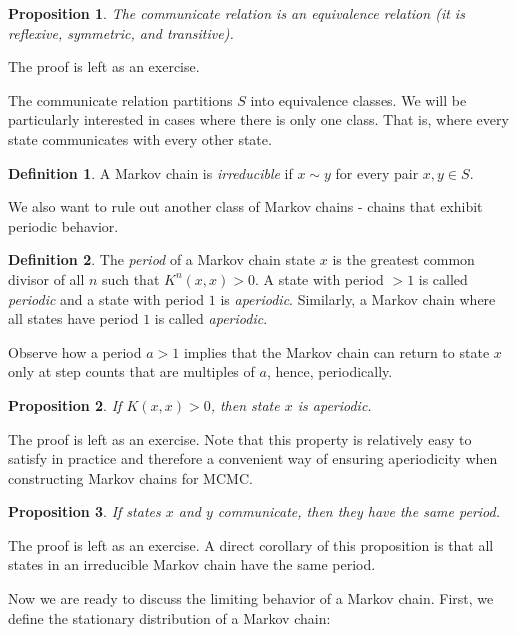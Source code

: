 \documentclass{book}
\theoremstyle{plain}%
\newtheorem{proposition}{Proposition}[section]
\theoremstyle{definition}
\newtheorem{definition}{Definition}[section]
\begin{document}
\begin{proposition} The communicate relation is an equivalence relation (it is reflexive, symmetric, and transitive).
\label{prop:communicate}
\end{proposition}

The proof is left as an exercise.

The communicate relation partitions $S$ into equivalence classes. We will be particularly interested in cases where there is only one class. That is, where every state communicates with every other state.

\begin{definition} A Markov chain is \emph{irreducible} if $x \sim y$ for every pair $x, y \in S$.
\end{definition}

We also want to rule out another class of Markov chains - chains that exhibit periodic behavior.

\begin{definition} The \emph{period} of a Markov chain state $x$ is the greatest common divisor of all $n$ such that $K^n(x,x) > 0$. A state with period $> 1$ is called \emph{periodic} and a state with period $1$ is \emph{aperiodic}. Similarly, a Markov chain where all states have period $1$ is called \emph{aperiodic}.
\end{definition}

Observe how a period $a > 1$ implies that the Markov chain can return to state $x$ only at step counts that are multiples of $a$, hence, periodically.

\begin{proposition} If $K(x,x) > 0$, then state $x$ is aperiodic.\label{prop:periodic1}
\end{proposition}

The proof is left as an exercise. Note that this property is relatively easy to satisfy in practice and therefore a convenient way of ensuring aperiodicity when constructing Markov chains for MCMC.

\begin{proposition} If states $x$ and $y$ communicate, then they have the same period.\label{prop:periodic2}
\end{proposition}

The proof is left as an exercise. A direct corollary of this proposition is that all states in an irreducible Markov chain have the same period.

Now we are ready to discuss the limiting behavior of a Markov chain. First, we define the stationary distribution of a Markov chain:
\end{document}
